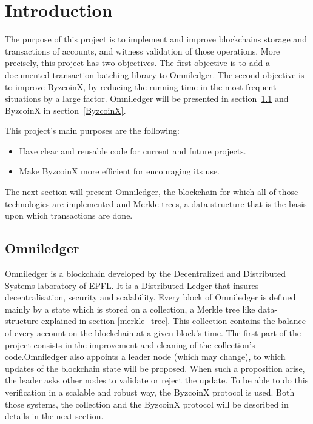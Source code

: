 \documentclass[11pt, a4paper, twoside, openright]{article}
\begin{document}

\tableofcontents
\newpage
\section{Introduction}
The purpose of this project is to implement and improve blockchains storage and transactions of accounts, and witness validation of those operations. More precisely, this project has two objectives. The first objective is to add a documented transaction batching library to Omniledger\cite{Omniledger}. The second objective is to improve ByzcoinX\cite{Byzcoin}, by reducing the running time in the most frequent situations by a large factor. Omniledger will be presented in section~\ref{Omniledger} and ByzcoinX in section~\ref{ByzcoinX}.

This project's main purposes are the following:
\begin{itemize}
\itemsep0em
\item Have clear and reusable code for current and future projects. 
\item Make ByzcoinX more efficient for encouraging its use.
\end{itemize}

The next section will present Omniledger, the blockchain for which all of those technologies are implemented and Merkle trees, a data structure that is the basis upon which transactions are done.

\subsection{Omniledger}
\label{Omniledger}
Omniledger\cite{Omniledger} is a blockchain developed by the Decentralized and Distributed Systems laboratory of EPFL. It is a Distributed Ledger that insures decentralisation, security and scalability. Every block of Omniledger is defined mainly by a state which is stored on a collection, a Merkle tree like data-structure explained in section \ref{merkle_tree}. This collection contains the balance of every account on the blockchain at a given block's time. The first part of the project consists in the improvement and cleaning of the collection's code.Omniledger also appoints a leader node (which may change), to which updates of the blockchain state will be proposed. When such a proposition arise, the leader asks other nodes to validate or reject the update. To be able to do this verification in a scalable and robust way, the ByzcoinX protocol is used. Both those systems, the collection and the ByzcoinX protocol will be described in details in the next section.
\end{document}
